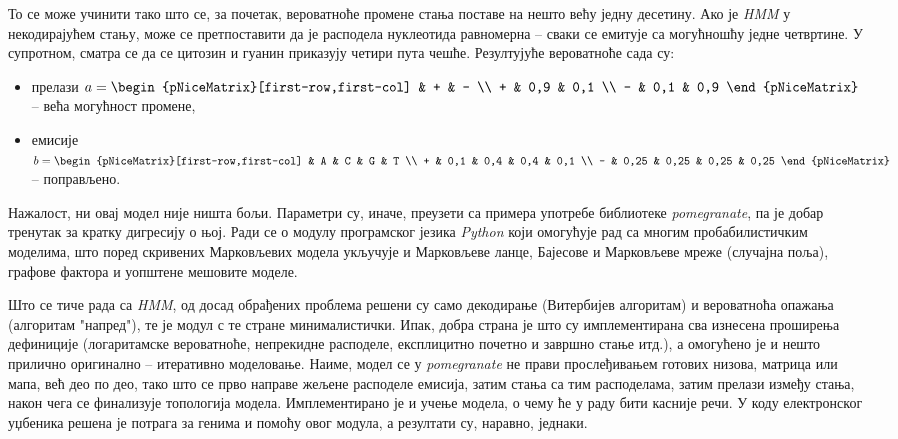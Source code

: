 \documentclass[12pt,oneside]{memoir}
\begin{document}
\begin{CJK}{UTF8}{ipxm}
То се може учинити тако што се, за почетак, вероватноће промене стања поставе на нешто већу једну десетину. Ако је \textit{HMM} у некодирајућем стању, може се претпоставити да је расподела нуклеотида равномерна -- сваки се емитује са могућношћу једне четвртине. У супротном, сматра се да се цитозин и гуанин приказују четири пута чешће. Резултујуће вероватноће сада су:
\begin{itemize}
  \item прелази $a = \begin{pNiceMatrix}[first-row,first-col] & + & - \\ + & 0,9 & 0,1 \\ - & 0,1 & 0,9 \end{pNiceMatrix}$ -- већа могућност промене,
  \item емисије $b = \begin{pNiceMatrix}[first-row,first-col] & A & C & G & T \\ + & 0,1 & 0,4 & 0,4 & 0,1 \\ - & 0,25 & 0,25 & 0,25 & 0,25 \end{pNiceMatrix}$ -- поправљено.
\end{itemize}

Нажалост, ни овај модел није ништа бољи. Параметри су, иначе, преузети са примера употребе библиотеке \textit{pomegranate}\cite{schreiber2021}, па је добар тренутак за кратку дигресију о њој. Ради се о модулу програмског језика \textit{Python} који омогућује рад са многим пробабилистичким моделима, што поред скривених Марковљевих модела укључује и Марковљеве ланце, Бајесове и Марковљеве мреже (случајна поља), графове фактора и уопштене мешовите моделе.

Што се тиче рада са \textit{HMM}, од досад обрађених проблема решени су само декодирање (Витербијев алгоритам) и вероватноћа опажања (алгоритам "напред"), те је модул с те стране минималистички. Ипак, добра страна је што су имплементирана сва изнесена проширења дефиниције (логаритамске вероватноће, непрекидне расподеле, експлицитно почетно и завршно стање итд.), а омогућено је и нешто прилично оригинално -- итеративно моделовање. Наиме, модел се у \textit{pomegranate} не прави прослеђивањем готових низова, матрица или мапа, већ део по део, тако што се прво направе жељене расподеле емисија, затим стања са тим расподелама, затим прелази између стања, након чега се финализује топологија модела. Имплементирано је и учење модела, о чему ће у раду бити касније речи. У коду електронског уџбеника решена је потрага за генима и помоћу овог модула, а резултати су, наравно, једнаки.


\end{CJK}
\end{document}
